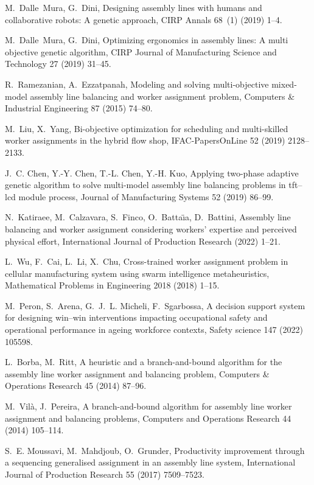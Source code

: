 \documentclass[review,12pt, 3p, times]{elsarticle}
\begin{document}
\begin{thebibliography}{00}
M.~Dalle~Mura, G.~Dini, Designing assembly lines with humans and collaborative
  robots: A genetic approach, CIRP Annals 68~(1) (2019) 1--4.

M.~Dalle~Mura, G.~Dini, Optimizing ergonomics in assembly lines: A multi
  objective genetic algorithm, CIRP Journal of Manufacturing Science and
  Technology 27 (2019) 31--45.

R.~Ramezanian, A.~Ezzatpanah, Modeling and solving multi-objective mixed-model
  assembly line balancing and worker assignment problem, Computers \&
  Industrial Engineering 87 (2015) 74--80.

M.~Liu, X.~Yang, Bi-objective optimization for scheduling and multi-skilled
  worker assignments in the hybrid flow shop, IFAC-PapersOnLine 52 (2019)
  2128--2133.

J.~C. Chen, Y.-Y. Chen, T.-L. Chen, Y.-H. Kuo, Applying two-phase adaptive
  genetic algorithm to solve multi-model assembly line balancing problems in
  tft--lcd module process, Journal of Manufacturing Systems 52 (2019) 86--99.

N.~Katiraee, M.~Calzavara, S.~Finco, O.~Batta{\"\i}a, D.~Battini, Assembly line
  balancing and worker assignment considering workers’ expertise and
  perceived physical effort, International Journal of Production Research
  (2022) 1--21.

L.~Wu, F.~Cai, L.~Li, X.~Chu, Cross-trained worker assignment problem in
  cellular manufacturing system using swarm intelligence metaheuristics,
  Mathematical Problems in Engineering 2018 (2018) 1--15.

M.~Peron, S.~Arena, G.~J.~L. Micheli, F.~Sgarbossa, A decision support system
  for designing win--win interventions impacting occupational safety and
  operational performance in ageing workforce contexts, Safety science 147
  (2022) 105598.

L.~Borba, M.~Ritt, A heuristic and a branch-and-bound algorithm for the
  assembly line worker assignment and balancing problem, Computers \&
  Operations Research 45 (2014) 87--96.

M.~Vilà, J.~Pereira, A branch-and-bound algorithm for assembly line worker
  assignment and balancing problems, Computers and Operations Research 44
  (2014) 105--114.

S.~E. Moussavi, M.~Mahdjoub, O.~Grunder, Productivity improvement through a
  sequencing generalised assignment in an assembly line system, International
  Journal of Production Research 55 (2017) 7509--7523.


\end{thebibliography}
\end{document}

